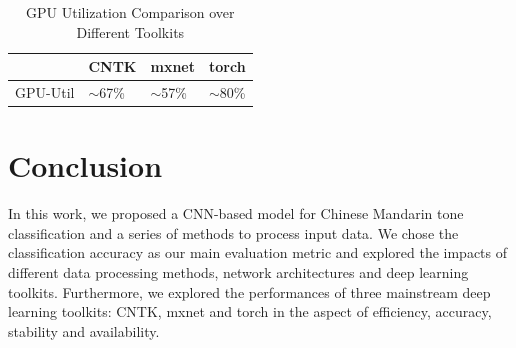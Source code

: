 \documentclass[a4paper, 11pt]{article} %
\begin{document}
\begin{table}[H]
\centering
\begin{tabular}{l|l|l|l}
         & CNTK       & mxnet      & torch      \\ \hline
GPU-Util & $\sim$67\% & $\sim$57\% & $\sim$80\%
\end{tabular}
\caption{GPU Utilization Comparison over Different Toolkits}
\label{my-label}
\end{table}

\newpage

\section{Conclusion}
In this work, we proposed a CNN-based model for Chinese Mandarin tone classification and a series of methods to process input data. 
We chose the classification accuracy as our main evaluation metric and explored the impacts of different data processing methods, network architectures and deep learning toolkits. Furthermore, we explored the performances of three mainstream deep learning toolkits: CNTK, mxnet and torch in the aspect of efficiency, accuracy, stability and availability.




\end{document}
